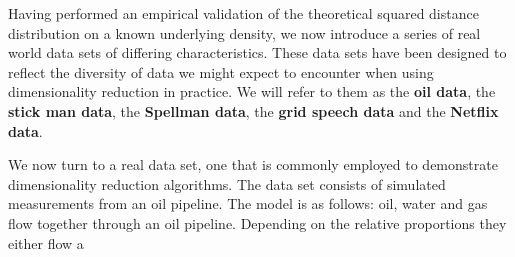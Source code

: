 \begin{comment}
  \section{Sanity Check}

  \textbf{Same data generation, but fewer data points.}
  \begin{itemize}
  \item If dimensions are independent, we expect low variance, Gaussian behaviour
    for the density of squared distances.
  \end{itemize}
  \textbf{Squared distance density for a Gaussian with $\dataDim=1000$}\textbf{\emph{,
      $\numData=100$}}

  \begin{figure}
  \begin{matlab}
    close all
    Y = randn(100, 1000);
    dimredPlotSquaredDistances(Y, 'gaussianDistances100', [], 0.6*textWidth);
  \end{matlab}
    \begin{center}
      \inputdiagram{../../../dimred/tex/diagrams/gaussianDistances100}
      \end{center}

    \caption{A good match betwen theory and the samples for a 1000 dimensional
      Gaussian distribution.}

  \end{figure}

\end{comment}

Having performed an empirical validation of the theoretical squared
distance distribution on a known underlying density, we now introduce
a series of real world data sets of differing characteristics. These
data sets have been designed to reflect the diversity of data we might
expect to encounter when using dimensionality reduction in
practice. We will refer to them as the \textbf{oil data}, the \textbf{stick man data}, the \textbf{Spellman data}, the
\textbf{grid speech data} and the \textbf{Netflix data}.

We now turn to a real data set, one that is commonly employed to
demonstrate dimensionality reduction algorithms. The data set consists
of simulated measurements from an oil pipeline. The model is as
follows: oil, water and gas flow together through an oil
pipeline. Depending on the relative proportions they either flow a

